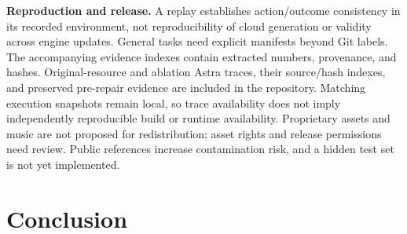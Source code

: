 \documentclass[11pt,a4paper]{article}
\begin{document}
\textbf{Reproduction and release.} A replay establishes action/outcome consistency in its recorded environment, not reproducibility of cloud generation or validity across engine updates. General tasks need explicit manifests beyond Git labels. The accompanying evidence indexes contain extracted numbers, provenance, and hashes. Original-resource and ablation Astra traces, their source/hash indexes, and preserved pre-repair evidence are included in the repository. Matching execution snapshots remain local, so trace availability does not imply independently reproducible build or runtime availability. Proprietary assets and music are not proposed for redistribution; asset rights and release permissions need review. Public references increase contamination risk, and a hidden test set is not yet implemented.

\section{\texorpdfstring{Conclusion}{Conclusion}}
\end{document}

